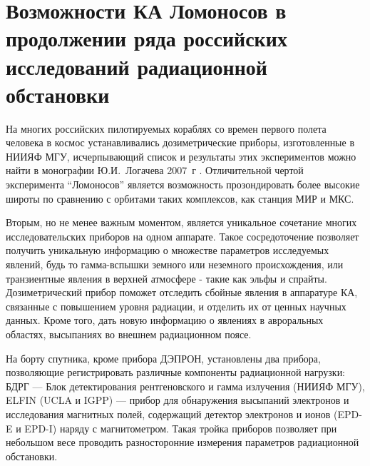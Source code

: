 \section{Возможности КА Ломоносов в продолжении ряда российских исследований радиационной обстановки}

На многих российских пилотируемых кораблях со времен первого полета человека в космос устанавливались дозиметрические приборы, изготовленные в НИИЯФ МГУ, исчерпывающий список и результаты этих экспериментов можно найти в монографии Ю.И.~Логачева 2007~г \cite{logachev2007}. Отличительной чертой эксперимента ``Ломоносов'' является возможность прозондировать более высокие широты по сравнению с орбитами таких комплексов, как станция МИР и МКС. 

Вторым, но не менее важным моментом, является уникальное сочетание многих исследовательских приборов на одном аппарате. Такое сосредоточение позволяет получить уникальную информацию о множестве параметров исследуемых явлений, будь то гамма-вспышки земного или неземного происхождения, или транзиентные явления в верхней атмосфере - такие как эльфы и спрайты. Дозиметрический прибор поможет отследить сбойные явления в аппаратуре КА, связанные с повышением уровня радиации, и отделить их от ценных научных данных. Кроме того, дать новую информацию о явлениях в авроральных областях, высыпаниях во внешнем радиационном поясе.

На борту спутника, кроме прибора ДЭПРОН, установлены два прибора, позволяющие регистрировать различные компоненты радиационной нагрузки: БДРГ --- Блок детектирования рентгеновского и гамма излучения (НИИЯФ МГУ), ELFIN (UCLA и IGPP) --- прибор для обнаружения высыпаний электронов и исследования магнитных полей, содержащий детектор электронов и ионов (EPD-E и EPD-I) наряду с магнитометром. Такая тройка приборов позволяет при небольшом весе проводить разносторонние измерения параметров радиационной обстановки.



